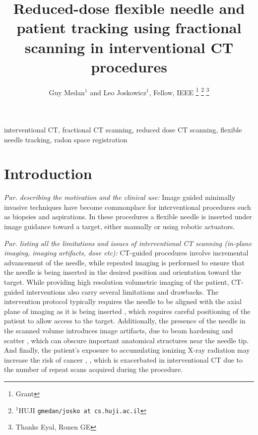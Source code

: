\documentclass[letterpaper, 11 pt, conference]{ieeeconf}  %
\title{\LARGE \bf
Reduced-dose flexible needle and patient tracking using fractional scanning in interventional CT procedures 
}
\author{Guy Medan$^{1}$ and Leo Joskowicz$^{1}$, Fellow, IEEE%
\thanks{Grant}%
\thanks{$^{1}$HUJI
        {\tt\small gmedan/josko at cs.huji.ac.il}}%
\thanks{Thanks Eyal, Ronen GE}%
}
\begin{document}
\maketitle
\thispagestyle{plain}
\pagestyle{plain}


\begin{abstract}
\lipsum[1]

\end{abstract}

\begin{keywords}
interventional CT, fractional CT scanning, reduced dose CT scanning, flexible needle tracking, radon space registration 
\end{keywords}

\section{Introduction}

\textit{Par. describing the motivation and the clinical use:}
Image guided minimally invasive techniques have become commonplace for interventional procedures such as biopsies and aspirations.
In these procedures a flexible needle is inserted under image guidance toward a target, either manually or using robotic actuators.

\textit{Par. listing all the limitations and issues of interventional CT scanning (in-plane imaging, imaging artifacts, dose etc):}
CT-guided procedures involve incremental advancement of the needle, while repeated imaging is performed to ensure that the needle is being inserted in the desired position and orientation toward the target.
While providing high resolution volumetric imaging of the patient, CT-guided interventions also carry several limitations and drawbacks.
The intervention protocol typically requires the needle to be aligned with the axial plane of imaging as it is being inserted \cite{gupta2014ct}, which requires careful positioning of the patient to allow access to the target.
Additionally, the presence of the needle in the scanned volume introduces image artifacts, due to beam hardening and scatter \cite{boas2012ctartifacts}, which can obscure important anatomical structures near the needle tip.
And finally, the patient's exposure to accumulating ionizing X-ray radiation may increase the risk of cancer \cite{mettler2000ct}, \cite{chodick2007excess}, which is exacerbated in interventional CT due to the number of repeat scans acquired during the procedure.
\end{document}

